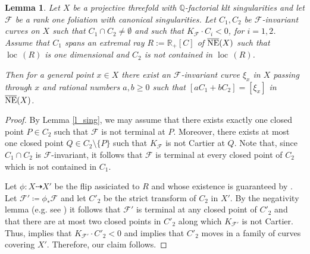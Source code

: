 \documentclass[12pt]{amsart}
\newtheorem{lemma}[theorem]{Lemma}
\newcommand{\loc}[1]{\operatorname{loc} \, #1}
\newcommand{\cal}[1]{\mathcal{#1}}
\begin{document}
\begin{lemma}\label{l_irreducible}
Let $X$ be a  projective threefold with $\mathbb Q$-factorial klt singularities and let $\cal F$ be a rank one foliation with canonical singularities. Let $C_1,C_2$ be  $\cal F$-invariant  curves on $X$ such that $C_1\cap C_2\neq \emptyset$ and such that $K_{\cal F}\cdot C_i<0$, for $i=1,2$. Assume that $C_1$ spans an extremal ray $R:=\mathbb R_+[C]$ of $\overline {\rm NE}(X)$ such that $\loc (R)$ is one dimensional and $C_2$ is not contained in $\loc (R)$. 

Then for a general point $x\in X$ there exist an $\mathcal F$-invariant curve $\xi_x$ in $X$ passing through $x$ and rational numbers $a,b\ge 0$ such that $[a C_1+b C_2]=[\xi_x]$ in $\overline{\rm NE}(X)$.
\end{lemma}
\begin{proof} 
 By Lemma \ref{l_sing}, we may assume that there exists exactly one closed point $P\in C_2$ such that  $\mathcal F$ is not
terminal at $P$. Moreover, there exists at most one closed point $Q\in C_2\setminus \{P\}$ such that $K_{\cal F}$ is not Cartier at $Q$. Note that, since $C_1\cap C_2$ is $\cal F$-invariant, it follows that $\cal F$ is terminal at every closed point of $C_2$ which is not contained in $C_1$. 

Let $\phi\colon X\dashrightarrow X'$ be the flip assiciated to $R$ and whose existence is guaranteed by 
 \cite[Theorem 8.8]{CS20}. Let $\cal F'\coloneq\phi_*\cal F$ and let $C'_2$  be the strict transform of $C_2$ in $X'$. By the negativity lemma (e.g. see \cite[Lemma 2.7]{CS20}) it follows that $\cal F'$ is terminal at any closed point of  $C'_2$ and that there are at most two closed points in $C'_2$ along which $K_{\cal F'}$ is not Cartier. Thus,  \cite[Proposition 2.13]{CS20} implies that $K_{\cal F'}\cdot C'_2<0$ and \cite[Proposition 3.3]{CS20} implies that $C'_2$ moves in a family of curves covering $X'$. Therefore, our claim follows. 
\end{proof}
\end{document}
